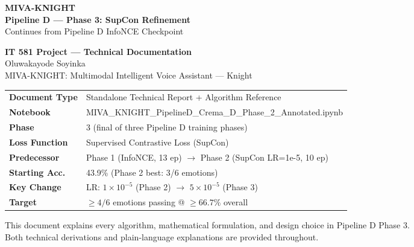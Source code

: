 \documentclass[12pt,a4paper]{article}
\theoremstyle{definition}
\theoremstyle{remark}
\begin{document}
\begin{titlepage}
\centering
\vspace*{1.5cm}

{\Huge\bfseries\color{cDark} MIVA-KNIGHT}\\[0.4cm]
{\Large\bfseries Pipeline D — Phase 3: SupCon Refinement}\\[0.3cm]
{\large Continues from Pipeline D InfoNCE Checkpoint}\\[0.8cm]


\vspace{1.2cm}

{\large\bfseries IT 581 Project — Technical Documentation}\\[0.3cm]
{\large Oluwakayode Soyinka}\\[0.2cm]
{\normalsize MIVA-KNIGHT: Multimodal Intelligent Voice Assistant — Knight}\\[0.8cm]

\begin{tabular}{ll}
\toprule
\textbf{Document Type}    & Standalone Technical Report + Algorithm Reference \\
\textbf{Notebook}         & MIVA\_KNIGHT\_PipelineD\_Crema\_D\_Phase\_2\_Annotated.ipynb \\
\textbf{Phase}            & 3 (final of three Pipeline D training phases) \\
\textbf{Loss Function}    & Supervised Contrastive Loss (SupCon) \\
\textbf{Predecessor}      & Phase 1 (InfoNCE, 13 ep) $\to$ Phase 2 (SupCon LR=1e-5, 10 ep) \\
\textbf{Starting Acc.}    & 43.9\% (Phase 2 best: 3/6 emotions) \\
\textbf{Key Change}       & LR: $1\times10^{-5}$ (Phase 2) $\to$ $5\times10^{-5}$ (Phase 3) \\
\textbf{Target}           & $\geq 4/6$ emotions passing @ $\geq 66.7\%$ overall \\
\bottomrule
\end{tabular}

\vfill
{\small\color{gray}
This document explains every algorithm, mathematical formulation,
and design choice in Pipeline D Phase 3.\\
Both technical derivations and plain-language explanations are provided throughout.}
\end{titlepage}
\end{document}
